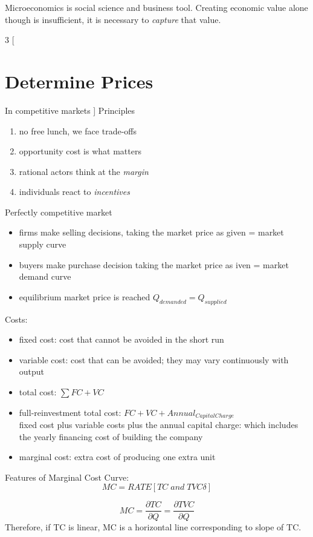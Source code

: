 \documentclass[8pt]{report}
\begin{document}
Microeconomics is social science and business tool. Creating economic value alone though is insufficient, it is necessary to \textit{capture} that value.

\begin{multicols}{3}
[
\section{Determine Prices}
In competitive markets
]
Principles
\begin{enumerate}
\item no free lunch, we face trade-offs
\item opportunity cost is what matters
\item rational actors think at the \textit{margin}
\item individuals react to \textit{incentives}
\end{enumerate}

Perfectly competitive market 
\begin{itemize}
\item firms make selling decisions, taking the market price as given = market supply curve 
\item buyers make purchase decision taking the market price as iven = market demand curve
\item equilibrium market price is reached $Q_{demanded} = Q_{supplied}$
\end{itemize}

Costs: 
\begin{itemize}
\item fixed cost: cost that cannot be avoided in the short run
\item variable cost: cost that can be avoided; they may vary continuously with output
\item total cost: $\sum FC + VC$
\item full-reinvestment total cost: $FC + VC + Annual_{CapitalCharge}$ \\ fixed cost plus variable costs plus the annual capital charge: which includes the yearly financing cost of building the company
\item marginal cost: extra cost of producing one extra unit 
\end{itemize}

Features of Marginal Cost Curve:
$$
	MC = RATE[TC \; and \; TVC \delta]
$$

$$
	MC = \frac{\partial TC}{\partial Q} = \frac{\partial TVC}{\partial Q}
$$
Therefore, if TC is linear, MC is a horizontal line corresponding to slope of TC.

\end{multicols}
\end{document}
